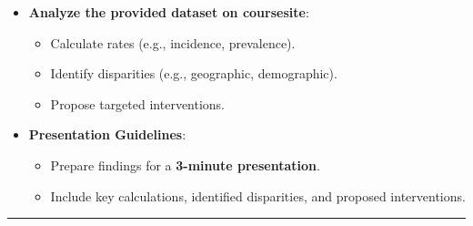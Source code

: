\documentclass[
  letterpaper,
  DIV=11,
  numbers=noendperiod]{scrartcl}
\providecommand{\tightlist}{%
  \setlength{\itemsep}{0pt}\setlength{\parskip}{0pt}}\usepackage{longtable,booktabs,array}
\begin{document}
\begin{itemize}
\tightlist
\item
  \textbf{Analyze the provided dataset on coursesite}:

  \begin{itemize}
  \tightlist
  \item
    Calculate rates (e.g., incidence, prevalence).\\
  \item
    Identify disparities (e.g., geographic, demographic).\\
  \item
    Propose targeted interventions.
  \end{itemize}
\item
  \textbf{Presentation Guidelines}:

  \begin{itemize}
  \tightlist
  \item
    Prepare findings for a \textbf{3-minute presentation}.\\
  \item
    Include key calculations, identified disparities, and proposed
    interventions.
  \end{itemize}
\end{itemize}

\begin{center}\rule{0.5\linewidth}{0.5pt}\end{center}
\end{document}
